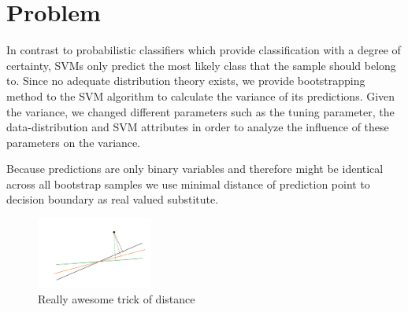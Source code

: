 \documentclass[a4paper]{article}
\begin{document}
 


\section{Problem}
  In contrast to probabilistic classifiers which provide classification with a degree of certainty, SVMs only predict the most likely class that the sample should belong to.  
Since no adequate distribution theory exists, we provide bootstrapping method to the SVM algorithm to calculate the variance of its predictions. Given the variance, we changed different parameters such as
the tuning parameter, the data-distribution and SVM attributes in order to analyze the influence of these parameters on the variance.

Because predictions are only binary variables and therefore might be identical across all bootstrap samples we use minimal distance of prediction point to decision boundary as real valued substitute. 



\begin{figure}[!htb]
\begin{center}
\includegraphics[width=1.5in]{abb/distances.jpg}
\caption{Really awesome trick of distance}
\label{fig1}
\end{center}
\end{figure}
\end{document}
